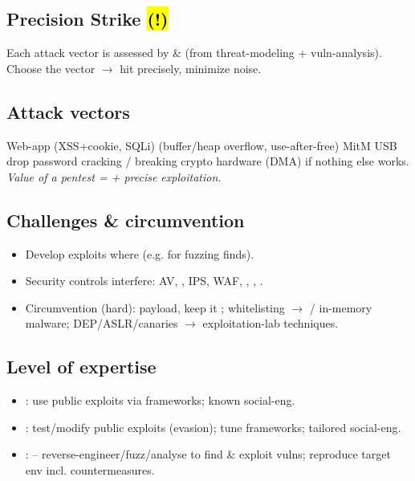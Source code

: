 \subsection{Precision Strike \hl{(!)}}
Each attack vector is assessed by  \&  (from threat-modeling + vuln-analysis). Choose the  vector $\to$ hit precisely, minimize noise.

\subsection{Attack vectors}
Web-app (XSS+cookie, SQLi) \textbullet{}  (buffer/heap overflow, use-after-free) \textbullet{} MitM \textbullet{} USB drop \textbullet{} password cracking / breaking crypto \textbullet{} hardware (DMA) \textbullet{}  if nothing else works. \textit{Value of a pentest =  + precise exploitation.}

\subsection{Challenges \& circumvention}
\begin{itemize}
\item Develop exploits where  (e.g. for fuzzing finds).
\item Security controls interfere: AV, , IPS, WAF, , , .
\item Circumvention (hard):  payload, keep it ; whitelisting $\to$  / in-memory malware; DEP/ASLR/canaries $\to$ exploitation-lab techniques.
\end{itemize}

\subsection{Level of expertise}
\begin{itemize}
\item {}: use public exploits via frameworks; known social-eng.
\item {}: test/modify public exploits (evasion); tune frameworks; tailored social-eng.
\item {}:  -- reverse-engineer/fuzz/analyse to find \& exploit  vulns; reproduce target env incl. countermeasures.
\end{itemize}

